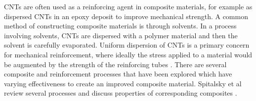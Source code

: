 	CNTs are often used as a reinforcing agent in composite materials, for example as dispersed CNTs in an epoxy deposit to improve mechanical strength. A common method of constructing composite materials is through solvents. In a process involving solvents, CNTs are dispersed with a polymer material and then the solvent is carefully evaporated. Uniform dispersion of CNTs is a primary concern for mechanical reinforcement, where ideally the stress applied to a material would be augmented by the strength of the reinforcing tubes \cite{Coleman2006}. There are several composite and reinforcement processes that have been explored which have varying effectiveness to create an improved composite material. Spitalsky et al review several processes and discuss properties of corresponding composites \cite{Spitalsky2010}.

\begin{figure}[t!]
		\centering
		\begin{subfigure}[t]{.33\textwidth}
			\centering

\end{subfigure}
\end{figure}
